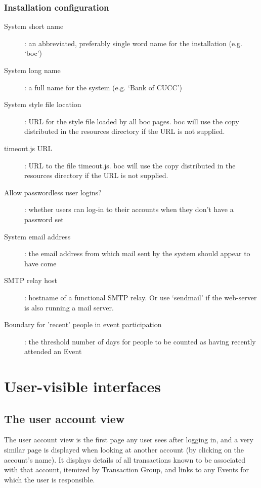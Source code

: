\documentclass{report}
\begin{document}
\subsection{Installation configuration}\label{inst_cfg}

\begin{description}
\item[System short name]: an abbreviated, preferably single word name for the installation (e.g. `boc')

\item[System long name]: a full name for the system (e.g. `Bank of CUCC')

\item[System style file location]: URL for the style file loaded by all boc pages.  boc will use the copy distributed in the resources directory if the URL is not supplied.

\item[timeout.js URL]: URL to the file timeout.js.  boc will use the copy distributed in the resources directory if the URL is not supplied.

\item[Allow passwordless user logins?]: whether users can log-in to their accounts when they don't have a password set

\item[System email address]: the email address from which mail sent by the system should appear to have come

\item[SMTP relay host]: hostname of a functional SMTP relay.  Or use `sendmail' if the web-server is also running a mail server.

\item[Boundary for 'recent' people in event participation]: the threshold number of days for people to be counted as having recently attended an Event
\end{description}

\chapter{User-visible interfaces}

\section{The user account view}

The user account view is the first page any user sees after logging in, and a very similar page is displayed when looking at another account (by clicking on the account's name).  It displays details of all transactions known to be associated with that account, itemized by Transaction Group, and links to any Events for which the user is responsible.
\end{document}
